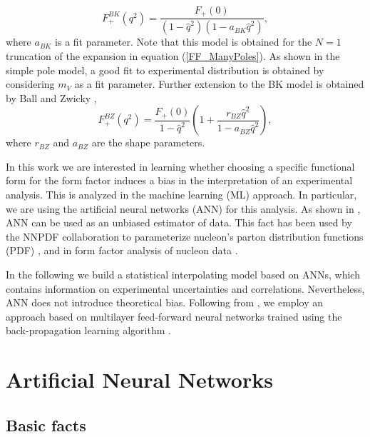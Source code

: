 %
\begin{equation}\label{FF_BK}
F_+^{BK}(q^2)  =  \frac{F_+(0)}{(1-\hat{q}^2)(1-a_{BK}\hat{q}^2)},
\end{equation}
%
where $a_{BK}$ is a fit parameter. 
Note that this model is obtained for the $N=1$ truncation of the expansion in equation (\ref{FF_ManyPoles}). As shown in the simple pole model, a good fit to experimental distribution is obtained 
by considering $m_V$ as a fit parameter. Further extension to the BK model is obtained by Ball and Zwicky \cite{Ball:2004ye},
%
\begin{equation}\label{FF_BZ}
F_+^{BZ} (q^2) = \frac{F_+(0)}{1-\hat{q}^2} \left(1+\frac{r_{BZ}\hat{q}^2}{1-a_{BZ}\hat{q}^2}\right),
\end{equation}
%
where $r_{BZ}$ and $a_{BZ}$ are the shape parameters.\par
In this work we are interested in learning whether choosing a specific functional form for the form factor induces a bias in the interpretation of an experimental analysis. This is analyzed in the machine learning (ML) approach. In particular, we are using the artificial neural networks (ANN) for this analysis. As shown in \cite{NNEstimator,NNEstimator2}, ANN can be used as an unbiased estimator of data. This fact has been used by the NNPDF collaboration to parameterize nucleon's parton distribution functions (PDF) \cite{Forte:2002fg,Ball:2014uwa,Rojo:2006nn}, and in form factor analysis of nucleon data \cite{Graczyk:2010gw,Alvarez-Ruso:2018rdx}.\par
In the following we build a statistical interpolating model based on ANNs, which contains information on experimental uncertainties and correlations. Nevertheless, ANN does not introduce theoretical bias. Following from \cite{Forte:2002fg,Ball:2014uwa}, we employ an approach based on multilayer feed-forward neural networks trained using the back-propagation learning algorithm \cite{Grant:2019yar}.

\section{Artificial Neural Networks}\label{ANN}
\subsection{Basic facts}

